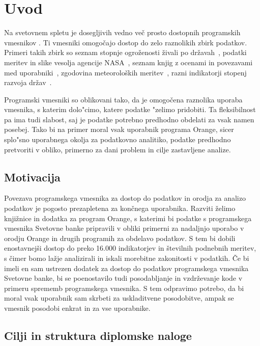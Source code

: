 
\chapter{Uvod}

Na svetovnem spletu je dosegljivih vedno več prosto dostopnih programskih
vmesnikov .
Ti vmesniki omogočajo dostop
do zelo raznolikih zbirk podatkov. Primeri takih zbirk so
seznam stopnje ogroženosti živali po državah~,
podatki meritev in slike vesolja agencije NASA~,
seznam knjig z ocenami in povezavami med uporabniki~,
zgodovina meteoroloških meritev~,
razni indikatorji stopenj razvoja držav~.
    

Programski vmesniki so oblikovani tako, da je omogočena raznolika uporaba
vmesnika, s katerim dolo"cimo, katere podatke "zelimo pridobiti.
Ta fleksibilnost pa ima tudi slabost, saj je 
podatke potrebno predhodno obdelati za vsak namen posebej. Tako bi na primer 
moral vsak uporabnik programa Orange, sicer splo"sno uporabnega okolja za 
podatkovno analitiko, podatke predhodno pretvoriti v obliko, 
primerno za dani problem in cilje zastavljene analize.


\section{Motivacija}

Povezava programskega vmesnika za dostop do podatkov in orodja za analizo 
podatkov je pogosto prezapletena za končnega uporabnika. Razviti želimo
knjižnice in dodatka za program Orange, s katerimi bi podatke s programskega
vmesnika Svetovne banke pripravili v obliki primerni za nadaljnjo
uporabo v orodju Orange in drugih programih za obdelavo podatkov. S tem bi
dobili enostavnejši dostop do preko 16.000 indikatorjev in številnih podnebnih
meritev, s čimer bomo lažje analizirali in iskali morebitne zakonitosti v
podatkih. Če bi imeli en sam ustrezen dodatek za dostop do podatkov
programskega vmesnika Svetovne banke, bi se poenostavilo tudi posodabljanje in
vzdrževanje kode v primeru sprememb programskega vmesnika. S tem odpravimo
potrebo, da bi moral vsak uporabnik sam skrbeti za uskladitvene posodobitve,
ampak se vmesnik posodobi enkrat in za vse uporabnike.


\section{Cilji in struktura diplomske naloge}

